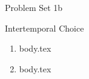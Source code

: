 \documentclass{handout}
\begin{document}
\centerline{\Large Problem Set 1b}
\centerline{\large Intertemporal Choice}

\begin{enumerate}


\item {body.tex}

\item {body.tex}

\end{enumerate}


\end{document}
